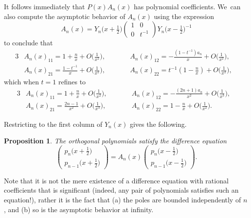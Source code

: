\documentclass[10pt,a4paper]{amsart}
\newtheorem{Proposition}[Theorem]{Proposition}
\theoremstyle{definition}
\numberwithin{equation}{section}
\begin{document}
It follows immediately that $P(x)A_n(x)$ has polynomial coefficients. We~can also compute the asymptotic behavior of $A_n(x)$ using the expression
\[
A_n(x)
=
Y_n\big(x+\tfrac{1}{2}\big)
\begin{pmatrix}
 1 & 0\\
 0 & t^{-1}
\end{pmatrix}
Y_n\big(x-\tfrac{1}{2}\big)^{-1}
\]
to conclude that
\begin{alignat*}{3}
& A_n(x)_{11} = 1+\tfrac{n}{x}+O\big(\tfrac{1}{x^2}\big),\qquad&&
A_n(x)_{12} = -\tfrac{(1-t^{-1})a_n}{x} + O\big(\tfrac{1}{x^2}\big),&\\
&A_n(x)_{21} = \tfrac{1-t^{-1}}{x}+O\big(\tfrac{1}{x^2}\big),\qquad&&
A_n(x)_{22} = t^{-1}(1-\tfrac{n}{x})+O\big(\tfrac{1}{x^2}\big),&
\end{alignat*}
which when $t=1$ refines to
\begin{alignat*}{3}
&A_n(x)_{11} = 1+\tfrac{n}{x}+O\big(\tfrac{1}{x^2}\big),\qquad&&
A_n(x)_{12} = -\tfrac{(2n+1)a_n}{x^2} + O\big(\tfrac{1}{x^3}\big),&\\
&A_n(x)_{21} = \tfrac{2n-1}{x^2}+O\big(\tfrac{1}{x^3}\big),\qquad&&
A_n(x)_{22} = 1-\tfrac{n}{x}+O\big(\tfrac{1}{x^2}\big).&
\end{alignat*}

Restricting to the first column of $Y_n(x)$ gives the following.

\begin{Proposition}
 The orthogonal polynomials satisfy the difference equation
 \[
 \begin{pmatrix}
 p_n\big(x+\frac{1}{2}\big)\\[1ex]
 p_{n-1}\big(x+\frac{1}{2}\big)
 \end{pmatrix}
 = A_n(x)
 \begin{pmatrix}
 p_n\big(x-\tfrac{1}{2}\big)\\[1ex]
 p_{n-1}\big(x-\tfrac{1}{2}\big)
 \end{pmatrix} .
 \]
\end{Proposition}

Note that it is not the mere existence of a difference equation with
rational coefficients that is significant (indeed, any pair of polynomials
satisfies such an equation!), rather it is the fact that (a) the poles are
bounded independently of $n$, and (b) so is the asymptotic behavior at
infinity.
\end{document}
